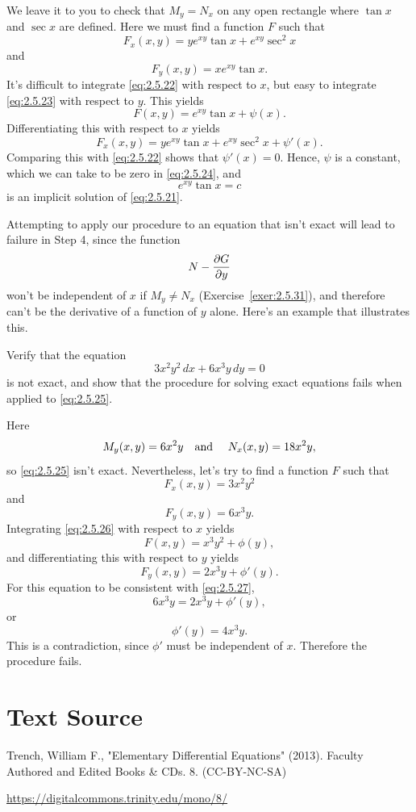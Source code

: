 \documentclass{ximera}
\begin{document}
\solution We leave it to you to check that
$M_y=N_x$ on any open rectangle  where $\tan x$ and $\sec x$ are
defined. Here we must find a function $F$ such that
\begin{equation} \label{eq:2.5.22}
F_x(x,y)=ye^{xy} \tan x+e^{xy} \sec^2 x
\end{equation}
 and
\begin{equation}  \label{eq:2.5.23}
F_y(x,y)=xe^{xy} \tan x.
\end{equation}
 It's difficult to integrate \eqref{eq:2.5.22} with respect to $x$, but
easy to integrate \eqref{eq:2.5.23} with respect to $y$.  This yields
\begin{equation} \label{eq:2.5.24}
F(x,y)=e^{xy} \tan x+\psi (x).
\end{equation}
Differentiating this with respect to $x$ yields
$$
F_x(x,y)=ye^{xy}\tan x+e^{xy}\sec^2x+\psi'(x).
$$
 Comparing this with \eqref{eq:2.5.22} shows that  $\psi'(x)=0$.
Hence, $\psi$ is  a constant, which we can take to be zero in
\eqref{eq:2.5.24}, and
$$
e^{xy} \tan x=c
$$
is an implicit solution of \eqref{eq:2.5.21}. \bbox

Attempting to apply our procedure to an equation that isn't  exact
will lead to failure in  Step 4, since the function
$$
 N-{\partial G\over\partial y}
$$
won't be independent of $x$ if $M_y\ne N_x$
(Exercise~\ref{exer:2.5.31}), and therefore
can't be the derivative of a function of $y$ alone. Here's an example that
illustrates this.

\begin{example}\label{example:2.5.5}  \rm
 Verify that the equation
\begin{equation} \label{eq:2.5.25}
3x^2y^2\,dx+6x^3y\,dy=0
\end{equation}
is not exact, and show  that the procedure for solving exact equations
  fails when applied to \eqref{eq:2.5.25}.
\end{example}

\solution   Here
$$
M_y(x,y)=6x^2y \mbox{\quad  and \quad } N_x(x,y)=18x^2y,
$$
so \eqref{eq:2.5.25} isn't  exact. Nevertheless,  let's try to find
a function $F$ such that
\begin{equation} \label{eq:2.5.26}
F_x(x,y)=3x^2y^2
\end{equation}
and
\begin{equation} \label{eq:2.5.27}
F_y(x,y)=6x^3y.
\end{equation}
Integrating \eqref{eq:2.5.26} with respect to $x$ yields
$$
F(x,y)=x^3y^2+\phi(y),
$$
and differentiating this with respect to $y$ yields
$$
F_y(x,y)=2x^3y+\phi'(y).
$$
For this equation to be consistent with \eqref{eq:2.5.27},
$$
6x^3y=2x^3y+\phi'(y),
$$
or
$$
\phi'(y)=4x^3y.
$$
This is a contradiction, since $\phi'$  must be independent
of $x$. Therefore the procedure fails.





\section*{Text Source}
Trench, William F., "Elementary Differential Equations" (2013). Faculty Authored and Edited Books \& CDs. 8. (CC-BY-NC-SA)

\href{https://digitalcommons.trinity.edu/mono/8/}{https://digitalcommons.trinity.edu/mono/8/}
\end{document}
